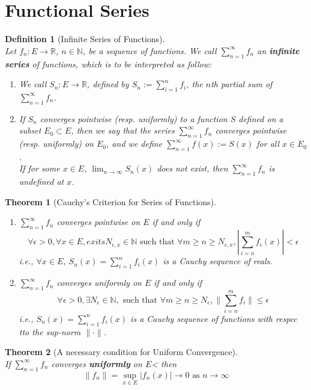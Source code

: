 \documentclass[12pt]{article}
\newtheorem{definition}{Definition}[section]
\newtheorem{theorem}{Theorem}[section]
\theoremstyle{definition}
\begin{document}
\section{Functional Series}
\begin{definition}[Infinite Series of Functions]
\hfill\\\normalfont Let $f_n:E\to\mathbb{R}$, $n\in \mathbb{N}$, be a sequence of functions. We call $\sum_{n=1}^\infty f_n$ an \textbf{infinite series} of functions, which is to be interpreted as follow:
\begin{enumerate}
	\item We call $S_n:E\to\mathbb{R}$, defined by $S_n:=\sum_{i=1}^n f_i$, the $n$th partial sum of $\sum_{n=1}^\infty f_n$.
	\item If $S_n$ converges pointwise (resp. uniformly) to a function $S$ defined on a subset $E_0\subset E$, then we say that the series $\sum_{n=1}^\infty f_n$ converges pointwise (resp. uniformly) on $E_0$, and we define $\sum_{n=1}^\infty f(x):=S(x)$ for all $x\in E_0$.\\
	If for some $x\in E$, $\lim_{n\to \infty}S_n(x)$ does not exist, then $\sum_{n=1}^\infty f_n$ is undefined at $x$.
\end{enumerate}
\end{definition}
\begin{theorem}[Cauchy's Criterion for Series of Functions]
\hfill\\\normalfont \begin{enumerate}
\item $\sum_{n=1}^\infty f_n$ converges pointwise on $E$ if and only if
\[
\forall \epsilon>0, \forall x\in E, exits N_{\epsilon, x}\in\mathbb{N}\text{ such that }\forall m\geq n\geq N_{\epsilon, x}, |\sum_{i=n}^m f_i(x)|<\epsilon
\]
i.e., $\forall x\in E$, $S_n(x)=\sum_{i=1}^n f_i(x)$ is a Cauchy sequence of reals.
\item $\sum_{n=1}^\infty f_n$ converges uniformly on $E$ if and only if
\[
\forall \epsilon>0, \exists N_\epsilon\in\mathbb{N},\text{ such that }\forall m\geq n\geq N_{\epsilon}, \|\sum_{i=n}^m f_i\|\leq \epsilon
\]
i.e., $S_n(x)=\sum_{i=1}^n f_i(x)$ is a Cauchy sequence of functions with respec tto the sup-norm $\|\cdot\|$.
\end{enumerate}
\end{theorem}
\begin{theorem}[A necessary condition for Uniform Convergence]
\hfill\\\normalfont If $\sum_{n=1}^\infty f_n$ converges \textbf{uniformly} on $E$< then
\[
\|f_n\|=\sup_{x\in E}|f_n(x)|\to 0\text{ as }n\to \infty
\]
\end{theorem}
\end{document}
